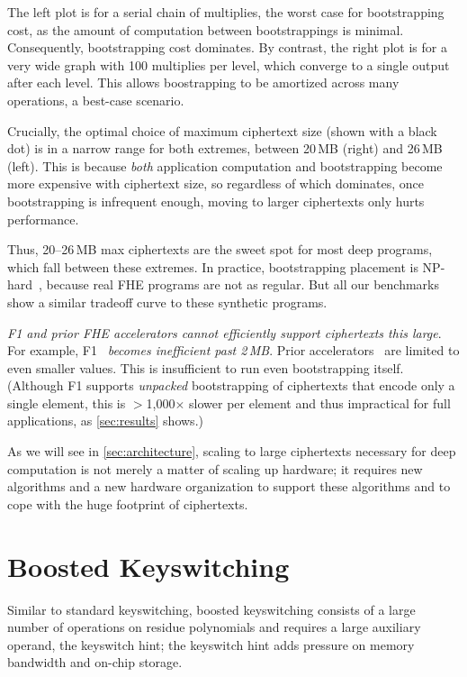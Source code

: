 The left plot is for a serial chain of multiplies, the worst case for
bootstrapping cost, as the amount of computation between bootstrappings is
minimal. Consequently, bootstrapping cost dominates. By contrast, the right
plot is for a very wide graph with 100 multiplies per level, which converge to
a single output after each level. This allows boostrapping to be amortized
across many operations, a best-case scenario.

Crucially, the optimal choice of maximum ciphertext size (shown with a black
dot) is in a narrow range for both extremes, between 20\,MB (right) and 26\,MB
(left). This is because \emph{both} application computation and bootstrapping
become more expensive with ciphertext size, so regardless of which dominates,
once bootstrapping is infrequent enough, moving to larger ciphertexts only
hurts performance.

Thus, 20--26\,MB max ciphertexts are the sweet spot for most deep programs,
which fall between these extremes. In practice, bootstrapping placement is
NP-hard~\cite{benhamouda2017optimization}, because real FHE programs are not as
regular. But all our benchmarks show a similar tradeoff curve to these
synthetic programs.

\figBootstrappingFrequency

\emph{F1 and prior FHE accelerators cannot efficiently support ciphertexts this
large}. For example, F1~\cite{feldmann:micro21:f1} \emph{becomes inefficient
past 2\,MB}. Prior accelerators~\cite{riazi:asplos20:heax} are limited to even
smaller values. This is insufficient to run even bootstrapping itself.
(Although F1 supports \emph{unpacked} bootstrapping of ciphertexts that encode
only a single element, this is $>$1,000$\times$ slower per element and thus
impractical for full applications, as \autoref{sec:results} shows.)

As we will see in \autoref{sec:architecture}, scaling to large ciphertexts
necessary for deep computation is not merely a matter of scaling up hardware;
it requires new algorithms and a new hardware organization to support these
algorithms and to cope with the huge footprint of ciphertexts.

\section{Boosted Keyswitching}
\label{sec:boostedKeyswitching}

Similar to standard keyswitching, boosted keyswitching consists of a large
number of operations on residue polynomials and requires a large auxiliary
operand, the keyswitch hint; the keyswitch hint adds pressure on memory
bandwidth and on-chip storage.

